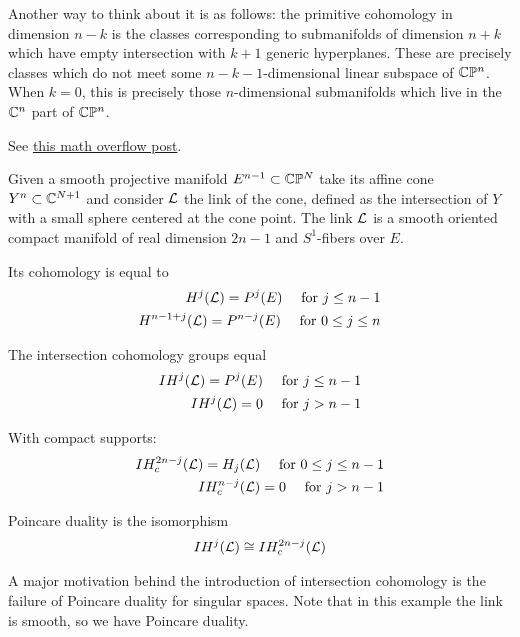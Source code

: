 \documentclass[12pt]{article}
\begin{document}
\hfill

Another way to think about it is as follows: the primitive cohomology in dimension $n-k$
is the classes corresponding to submanifolds of dimension $n+k$ which have empty
intersection with $k+1$ generic hyperplanes. These are precisely classes which do not 
meet some $n-k-1$-dimensional linear subspace of $\mathbb{C}\mathbb{P}^n$. When $k=0$, this is 
precisely those $n$-dimensional submanifolds which live in the $\mathbb{C}^n$ part of $\mathbb{C}\mathbb{P}^n$.

\hfill

See \href{https://mathoverflow.net/questions/14667/intuition-for-primitive-cohomology}{this 
math overflow post}.

\hfill 

Given a smooth projective manifold $E^{n-1}\subset \mathbb{C}\mathbb{P}^{N}$ take its affine cone
$Y^n \subset \mathbb{C}^{N+1}$ and consider ${\mathcal{L}}$ the link of the cone, defined
as the intersection of $Y$ with a small sphere centered at the cone point.
The link ${\mathcal{L}}$ is a smooth oriented 
compact manifold of real dimension $2n-1$ and $S^1$-fibers over $E$.

Its cohomology is equal to \begin{align*}
    H^j(\cL) = P^j(E) \texty{ for } j\leq n-1 \\
    H^{n-1+j}(\cL) = P^{n-j}(E) \texty{ for } 0\leq j\leq n
\end{align*}

The intersection cohomology groups equal \begin{align*}
    IH^j(\cL) = P^j(E) \texty{ for } j\leq n-1 \\
    IH^j(\cL) = 0 \texty{ for } j > n-1
\end{align*}

With compact supports:
\begin{align*}
    IH^{2n-j}_c(\cL) =H_j(\cL) \texty{ for } 0\leq j\leq n-1 \\
    IH^{n-j}_c(\cL) = 0 \texty{ for } j > n-1
\end{align*}


Poincare duality is the isomorphism \begin{align*}
    IH^j({\mathcal{L}}) \cong IH^{2n-j}_c({\mathcal{L}})
\end{align*}

\begin{remark}
    A major motivation behind the introduction of intersection
    cohomology is the failure of Poincare duality for singular spaces.
    Note that in this example the link is smooth, so we have Poincare duality.
\end{remark}
\end{document}
